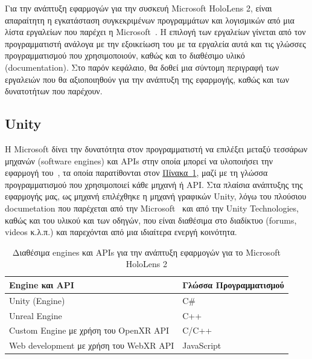 Για την ανάπτυξη εφαρμογών για την συσκευή Microsoft HoloLens 2, είναι απαραίτητη η εγκατάσταση συγκεκριμένων προγραμμάτων και λογισμικών από μια λίστα εργαλείων που παρέχει η Microsoft~\cite{thetuvix_2023_install,qianw211_2022_choosing}. Η επιλογή των εργαλείων γίνεται από τον προγραμματιστή ανάλογα με την εξοικείωση του με τα εργαλεία αυτά και τις γλώσσες προγραμματισμού που χρησιμοποιούν, καθώς και το διαθέσιμο υλικό (documentation). Στο παρόν κεφάλαιο, θα δοθεί μια σύντομη περιγραφή των εργαλειών που θα αξιοποιηθούν για την ανάπτυξη της εφαρμογής, καθώς και των δυνατοτήτων που παρέχουν.

\subsection{Unity}
Η Microsoft δίνει την δυνατότητα στον προγραμματιστή να επιλέξει μεταξύ τεσσάρων μηχανών (software engines) και APIs στην οποία μπορεί να υλοποιήσει την εφαρμογή του~\cite{qianw211_2022_choosing}, τα οποία παρατίθονται στον \hyperref[table:enginesAndApi]{Πίνακα~\ref*{table:enginesAndApi}}, μαζί με τη γλώσσα προγραμματισμού που χρησιμοποιεί κάθε μηχανή ή API\@. Στα πλαίσια ανάπτυξης της εφαρμογής μας, ως μηχανή επιλέχθηκε η μηχανή γραφικών Unity, λόγω του πλούσιου documetation που παρέχεται από την Microsoft~\cite{qianw211_2022_unity} και από την Unity Technologies, καθώς και του υλικού και των οδηγών, που είναι διαθέσιμα στο διαδίκτυο (forums, videos κ.λ.π.) και παρεχόνται από μια ιδιαίτερα ενεργή κοινότητα.

\begin{table}[!ht]
    \caption{Διαθέσιμα engines και APIs για την ανάπτυξη εφαρμογών για το Microsoft HoloLens 2}\label{table:enginesAndApi}
    \begin{tabularx}{\textwidth}{|X|X|} %
        \hline
        \textbf{Engine και API} & \textbf{Γλώσσα Προγραμματισμού} \\
        \hline
        Unity (Engine) & C\# \\
        \hline
        Unreal Engine & C++ \\
        \hline
        Custom Engine με χρήση του OpenXR API & C/C++ \\
        \hline
        Web development με χρήση του WebXR API & JavaScript \\
        \hline
    \end{tabularx}
\end{table}

